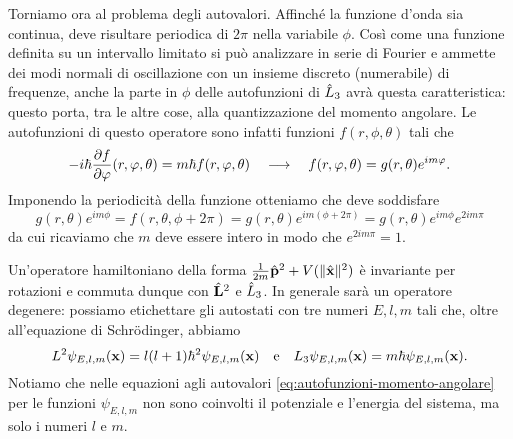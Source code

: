 Torniamo ora al problema degli autovalori.
Affinch\'e la funzione d'onda sia continua, deve risultare periodica di $2\pi$ nella variabile $\phi$.
Cos\`i come una funzione definita su un intervallo limitato si può analizzare in serie di Fourier e ammette dei modi normali di oscillazione con un insieme discreto (numerabile) di frequenze, anche la parte in $\phi$ delle autofunzioni di $\hat{L}_3$ avrà questa caratteristica: questo porta, tra le altre cose, alla quantizzazione del momento angolare.
Le autofunzioni di questo operatore sono infatti funzioni $f(r,\phi,\theta)$ tali che
\begin{equation}
	-i\hbar\frac{\partial {f}}{\partial {\varphi}}(r,\varphi,\theta)=m\hbar f(r,\varphi,\theta)\quad\longrightarrow\quad f(r,\varphi,\theta)=g(r,\theta)e^{im\varphi}.
\end{equation}
Imponendo la periodicità della funzione otteniamo che deve soddisfare
\begin{equation}
	g(r,\theta)e^{im\phi}=f(r,\theta,\phi+2\pi)=g(r,\theta)e^{im(\phi+2\pi)}=g(r,\theta)e^{im\phi}e^{2im\pi}
\end{equation}
da cui ricaviamo che $m$ deve essere intero in modo che $e^{2im\pi}=1$.

Un'operatore hamiltoniano della forma $\frac1{2m}\hat{\mathbf{p}}^2+V(\lVert\hat{\mathbf{x}}\rVert^2)$ è invariante per rotazioni e commuta dunque con $\hat{\mathbf{L}}^2$ e $\hat{L}_3$.
In generale sarà un operatore degenere: possiamo etichettare gli autostati con tre numeri $E,l,m$ tali che, oltre all'equazione di Schr\"odinger, abbiamo
\begin{equation}
	L^2\psi_{E,l,m}(\mathbf{x})=l(l+1)\hbar^2\psi_{E,l,m}(\mathbf{x})\quad\text{e}\quad L_3\psi_{E,l,m}(\mathbf{x})=m\hbar\psi_{E,l,m}(\mathbf{x}).
	\label{eq:autofunzioni-momento-angolare}
\end{equation}
Notiamo che nelle equazioni agli autovalori \eqref{eq:autofunzioni-momento-angolare} per le funzioni $\psi_{E,l,m}$ non sono coinvolti il potenziale e l'energia del sistema, ma solo i numeri $l$ e $m$.

